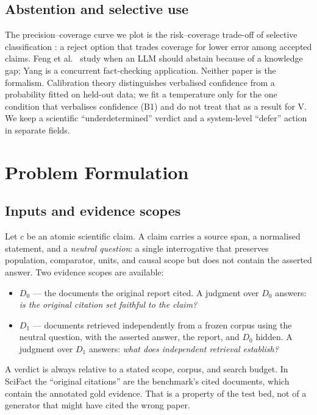 \documentclass[11pt,a4paper]{article}
\newcommand{\Dzero}{\ensuremath{D_0}}
\newcommand{\Done}{\ensuremath{D_1}}
\begin{document}
\subsection{Abstention and selective use}

The precision--coverage curve we plot is the risk--coverage trade-off of
selective classification \citep{elyaniv2010selective,geifman2017selective}:
a reject option that trades coverage for lower error among accepted
claims. Feng et al.~\citep{feng2024abstain} study when an LLM should
abstain because of a knowledge gap; Yang
\citep{yang2026calibratedselective} is a concurrent fact-checking
application. Neither paper is the formalism. Calibration theory
\citep{guo2017calibration} distinguishes verbalised confidence from a
probability fitted on held-out data; we fit a temperature only for the
one condition that verbalises confidence (B1) and do not treat that as a
result for V. We keep a scientific ``underdetermined'' verdict and a
system-level ``defer'' action in separate fields.

\section{Problem Formulation}

\subsection{Inputs and evidence scopes}

Let $c$ be an atomic scientific claim. A claim carries a source span, a
normalised statement, and a \emph{neutral question}: a single
interrogative that preserves population, comparator, units, and causal
scope but does not contain the asserted answer. Two evidence scopes are
available:

\begin{itemize}
  \item $\Dzero$ --- the documents the original report cited. A judgment
    over $\Dzero$ answers: \emph{is the original citation set faithful to
    the claim?}
  \item $\Done$ --- documents retrieved independently from a frozen
    corpus using the neutral question, with the asserted answer, the
    report, and $\Dzero$ hidden. A judgment over $\Done$ answers:
    \emph{what does independent retrieval establish?}
\end{itemize}

A verdict is always relative to a stated scope, corpus, and search
budget. In SciFact the ``original citations'' are the benchmark's cited
documents, which contain the annotated gold evidence. That is a property
of the test bed, not of a generator that might have cited the wrong
paper.
\end{document}
